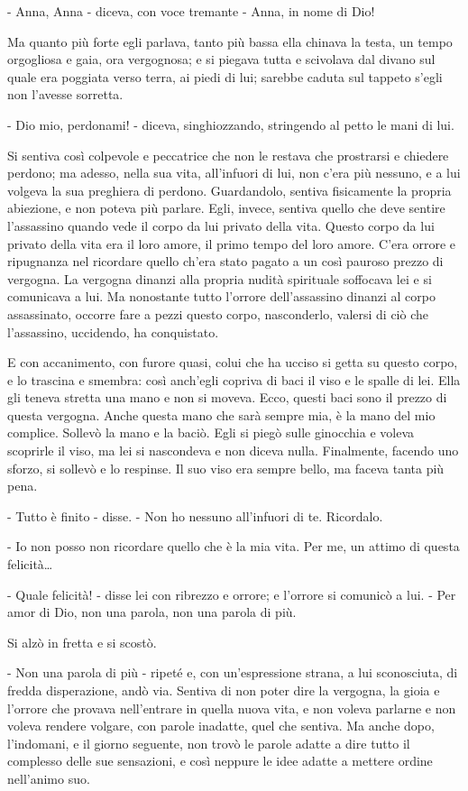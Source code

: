 - Anna, Anna - diceva, con voce tremante - Anna, in nome di Dio! 

Ma quanto più forte egli parlava, tanto più bassa ella chinava la testa, un tempo orgogliosa e gaia, ora vergognosa; e si piegava tutta e scivolava dal divano sul quale era poggiata verso terra, ai piedi di lui; sarebbe caduta sul tappeto s'egli non l'avesse sorretta. 

- Dio mio, perdonami! - diceva, singhiozzando, stringendo al petto le mani di lui. 

Si sentiva così colpevole e peccatrice che non le restava che prostrarsi e chiedere perdono; ma adesso, nella sua vita, all'infuori di lui, non c'era più nessuno, e a lui volgeva la sua preghiera di perdono. Guardandolo, sentiva fisicamente la propria abiezione, e non poteva più parlare. Egli, invece, sentiva quello che deve sentire l'assassino quando vede il corpo da lui privato della vita. Questo corpo da lui privato della vita era il loro amore, il primo tempo del loro amore. C'era orrore e ripugnanza nel ricordare quello ch'era stato pagato a un così pauroso prezzo di vergogna. La vergogna dinanzi alla propria nudità spirituale soffocava lei e si comunicava a lui. Ma nonostante tutto l'orrore dell'assassino dinanzi al corpo assassinato, occorre fare a pezzi questo corpo, nasconderlo, valersi di ciò che l'assassino, uccidendo, ha conquistato. 

E con accanimento, con furore quasi, colui che ha ucciso si getta su questo corpo, e lo trascina e smembra: così anch'egli copriva di baci il viso e le spalle di lei. Ella gli teneva stretta una mano e non si moveva. Ecco, questi baci sono il prezzo di questa vergogna. Anche questa mano che sarà sempre mia, è la mano del mio complice. Sollevò la mano e la baciò. Egli si piegò sulle ginocchia e voleva scoprirle il viso, ma lei si nascondeva e non diceva nulla. Finalmente, facendo uno sforzo, si sollevò e lo respinse. Il suo viso era sempre bello, ma faceva tanta più pena. 

- Tutto è finito - disse. - Non ho nessuno all'infuori di te. Ricordalo. 

- Io non posso non ricordare quello che è la mia vita. Per me, un attimo di questa felicità\ldots{} 

- Quale felicità! - disse lei con ribrezzo e orrore; e l'orrore si comunicò a lui. - Per amor di Dio, non una parola, non una parola di più. 

Si alzò in fretta e si scostò. 

- Non una parola di più - ripeté e, con un'espressione strana, a lui sconosciuta, di fredda disperazione, andò via. Sentiva di non poter dire la vergogna, la gioia e l'orrore che provava nell'entrare in quella nuova vita, e non voleva parlarne e non voleva rendere volgare, con parole inadatte, quel che sentiva. Ma anche dopo, l'indomani, e il giorno seguente, non trovò le parole adatte a dire tutto il complesso delle sue sensazioni, e così neppure le idee adatte a mettere ordine nell'animo suo. 

